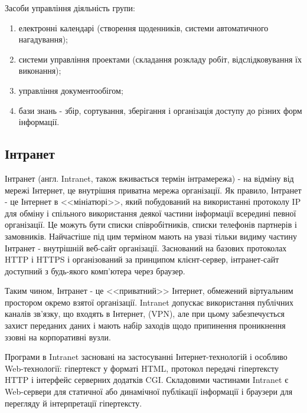 Засоби управління діяльність групи:
\begin{enumerate}
\item електронні календарі (створення щоденників, системи автоматичного нагадування);
\item системи управління проектами (складання розкладу робіт, відслідковування їх виконання);
\item управління документообігом;
\item бази знань - збір, сортування, зберігання і організація доступу до різних форм інформації.
\end{enumerate}





\subsection{Інтранет}
Інтранет (англ. Intranet, також вживається термін інтрамережа) - на відміну від мережі Інтернет, це внутрішня приватна мережа організації. 
Як правило, Інтранет - це Інтернет в <<мініатюрі>>, який побудований на використанні протоколу IP для обміну і спільного використання деякої частини інформації всередині певної організації. 
Це можуть бути списки співробітників, списки телефонів партнерів і замовників. 
Найчастіше під цим терміном мають на увазі тільки видиму частину Інтранет - внутрішній веб-сайт організації. 
Заснований на базових протоколах HTTP і HTTPS і організований за принципом клієнт-сервер, інтранет-сайт доступний з будь-якого комп'ютера через браузер. 
\par Таким чином, Інтранет - це <<приватний>> Інтернет, обмежений віртуальним простором окремо взятої організації. 
Intranet допускає використання публічних каналів зв'язку, що входять в Інтернет, (VPN), але при цьому забезпечується захист переданих даних і мають набір заходів щодо припинення проникнення ззовні на корпоративні вузли.
\par Програми в Intranet засновані на застосуванні Інтернет-технологій і особливо Web-технології: гіпертекст у форматі HTML, протокол передачі гіпертексту HTTP і інтерфейс серверних додатків CGI. 
Складовими частинами Intranet є Web-сервери для статичної або динамічної публікації інформації і браузери для перегляду й інтерпретації гіпертексту.

